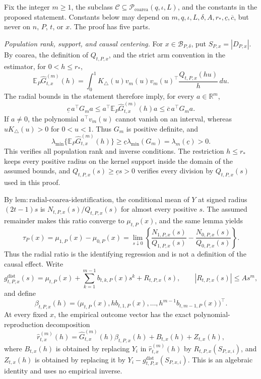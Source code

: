 Fix the integer \(m\geq1\), the subclass \(\mathcal C\subseteq\mathcal P_{\mathrm{coarea}}(q,\iota,L)\), and the constants in the proposed statement.  Constants below may depend on \(m,q,\iota,L,\delta,A,r_*,\underline c,\overline c\), but never on \(n\), \(P\), \(t\), or \(x\).  The proof has five parts.

\emph{Population rank, support, and causal centering.}
For \(x\in\mathcal B_{P,\delta}\), put \(S_{P,x}=|D_{P,x}|\).  By coarea, the definition of \(Q_{t,P,x}\), and the strict arm convention in the estimator, for \(0<h\leq r_*\),
\[
 \mathbb E_P\widehat G^{(m)}_{t,x}(h)
 =\int_0^1K_\triangle(u)v_m(u)v_m(u)^\top
 \frac{Q_{t,P,x}(hu)}h\,du.
\]
The radial bounds in the statement therefore imply, for every \(a\in\mathbb R^m\),
\[
 \underline c\,a^\top G_ma
 \leq a^\top\mathbb E_P\widehat G^{(m)}_{t,x}(h)a
 \leq\overline c\,a^\top G_ma.
\]
If \(a\neq0\), the polynomial \(a^\top v_m(u)\) cannot vanish on an interval, whereas \(uK_\triangle(u)>0\) for \(0<u<1\).  Thus \(G_m\) is positive definite, and
\[
 \lambda_{\min}\{\mathbb E_P\widehat G^{(m)}_{t,x}(h)\}
 \geq\underline c\lambda_{\min}(G_m)=\lambda_m(\underline c)>0.
\]
This verifies all population rank and inverse conditions.  The restriction \(h\leq r_*\) keeps every positive radius on the kernel support inside the domain of the assumed bounds, and \(Q_{t,P,x}(s)\geq\underline cs>0\) verifies every division by \(Q_{t,P,x}(s)\) used in this proof.

By \(\mathrm{lem:radial\text{-}coarea\text{-}identification}\), the conditional mean of \(Y\) at signed radius \((2t-1)s\) is \(N_{t,P,x}(s)/Q_{t,P,x}(s)\) for almost every positive \(s\).  The assumed remainder makes this ratio converge to \(\mu_{t,P}(x)\), and the same lemma yields
\[
 \tau_P(x)=\mu_{1,P}(x)-\mu_{0,P}(x)
 =\lim_{s\downarrow0}\left\{\frac{N_{1,P,x}(s)}{Q_{1,P,x}(s)}-\frac{N_{0,P,x}(s)}{Q_{0,P,x}(s)}\right\}.
\]
Thus the radial ratio is the identifying regression and is not a definition of the causal effect.  Write
\[
 g^{\mathrm{dist}}_{t,P,x}(s)
 =\mu_{t,P}(x)+\sum_{k=1}^{m-1}b_{t,k,P}(x)s^k+R_{t,P,x}(s),
 \qquad |R_{t,P,x}(s)|\leq As^m,
\]
and define
\[
 \beta_{t,P,x}(h)=
 \bigl(\mu_{t,P}(x),hb_{t,1,P}(x),\ldots,
 h^{m-1}b_{t,m-1,P}(x)\bigr)^\top.
\]
At every fixed \(x\), the empirical outcome vector has the exact polynomial-reproduction decomposition
\[
 \widehat r^{(m)}_{t,x}(h)
 =\widehat G^{(m)}_{t,x}(h)\beta_{t,P,x}(h)
 +B_{t,x}(h)+Z_{t,x}(h),
\]
where \(B_{t,x}(h)\) is obtained by replacing \(Y_i\) in \(\widehat r^{(m)}_{t,x}(h)\) by \(R_{t,P,x}(S_{P,x,i})\), and \(Z_{t,x}(h)\) is obtained by replacing it by
\(Y_i-g^{\mathrm{dist}}_{t,P,x}(S_{P,x,i})\).  This is an algebraic identity and uses no empirical inverse.

